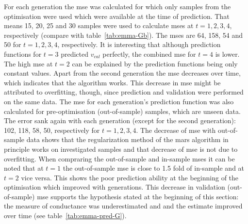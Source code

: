 For each generation the \gls{mse} was calculated for which only samples 
from the optimisation were used which were available at the time of prediction. 
That means 15, 20, 25 and 30 samples 
were used to calculate \gls{mse}s at $t=1,2,3,4$, respectively (compare with table~\ref{tab:emma-Gb}).
The \gls{mse}s are 64, 158, 54 and 50 for $t=1,2,3,4$, respectively. 
It is interesting that although prediction functions for $t=3$ predicted $v_{cal}$ perfectly, the combined \gls{mse} for $t=4$ is lower. 
The high \gls{mse} at $t=2$ can be explained by the prediction functions being only constant values. 
Apart from the second generation the \gls{mse} decreases  over time, 
which indicates that the algorithm works. 
This decrease in \gls{mse} might be attributed to overfitting, though, since prediction and validation were performed on the same data. 
The \gls{mse} for each generation's prediction function was also calculated for pre-optimisation (out-of-sample) samples, which are unseen data. 
The error sank again with each generation (except for the second generation): 102, 118, 58, 50, respectively for $t=1,2,3,4$. 
The decrease of \gls{mse} with out-of-sample data shows that the regularization method 
of the \gls{mars} algorithm in principle works on investigated samples and that decrease of \gls{mse} is not due to overfitting. 
%
When compraring the out-of-sample and in-sample \gls{mse}s it can be noted that at $t=1$ the out-of-sample \gls{mse} is close to 1.5 fold of in-sample and at $t=2$ vice versa.
This shows the poor prediction ability at the beginning of the optimisation which improved with generations.
This decrease in validation (out-of-sample) \gls{mse} supports the hypothesis stated at the beginning of this section: 
the measure of conductance was underestimated and and the estimate improved over time (see table~\ref{tab:emma-pred-G}).

